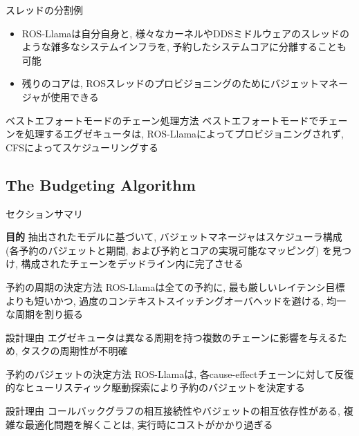 \begin{frame}{スレッドの分割例}
    \begin{itemize}
        \item ROS-Llamaは自分自身と, 様々なカーネルやDDSミドルウェアのスレッドのような雑多なシステムインフラを, 予約したシステムコアに分離することも可能
        \item 残りのコアは, ROSスレッドのプロビジョニングのためにバジェットマネージャが使用できる
    \end{itemize}
\end{frame}

\begin{frame}{ベストエフォートモードのチェーン処理方法}
    ベストエフォートモードでチェーンを処理するエグゼキュータは, ROS-Llamaによってプロビジョニングされず, CFSによってスケジューリングする
\end{frame}


\subsection{The Budgeting Algorithm}
\label{ssec: the budgeting algorithm}

\begin{frame}{セクションサマリ}
    \begin{itembox}[l]{\textbf{目的}}
        抽出されたモデルに基づいて, バジェットマネージャはスケジューラ構成 (各予約のバジェットと期間, および予約とコアの実現可能なマッピング) を見つけ, 構成されたチェーンをデッドライン内に完了させる
    \end{itembox}
\end{frame}

\begin{frame}{予約の周期の決定方法}
    ROS-Llamaは全ての予約に, 最も厳しいレイテンシ目標よりも短いかつ, 過度のコンテキストスイッチングオーバヘッドを避ける, 均一な周期を割り振る
    \begin{block}{設計理由}
        エグゼキュータは異なる周期を持つ複数のチェーンに影響を与えるため, タスクの周期性が不明確
    \end{block}
\end{frame}

\begin{frame}{予約のバジェットの決定方法}
    ROS-Llamaは, 各cause-effectチェーンに対して反復的なヒューリスティック駆動探索により予約のバジェットを決定する
    \begin{block}{設計理由}
        コールバックグラフの相互接続性やバジェットの相互依存性がある, 複雑な最適化問題を解くことは, 実行時にコストがかかり過ぎる
    \end{block}
\end{frame}


